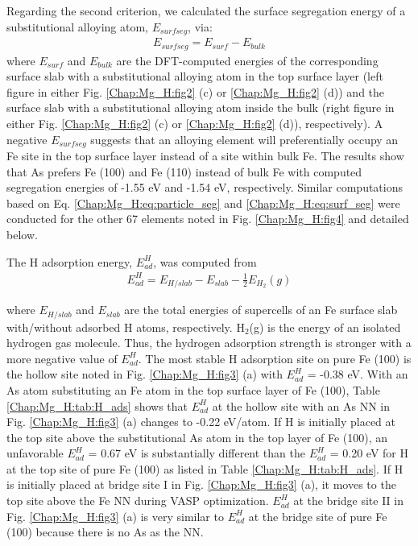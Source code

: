 Regarding the second criterion, we calculated the surface segregation energy of a substitutional alloying atom, $E_{surf seg}$, via:
\begin{align}
 E_{surf seg} = E_{surf} - E_{bulk}
 \label{Chap:Mg_H:eq:surf_seg}
\end{align}
where $E_{surf}$ and $E_{bulk}$ are the \ac{DFT}-computed energies of the corresponding surface slab with a substitutional alloying atom in the top surface layer (left figure in either Fig. \ref{Chap:Mg_H:fig2} (c) or \ref{Chap:Mg_H:fig2} (d)) and the surface slab with a substitutional alloying atom inside the bulk (right figure in either Fig. \ref{Chap:Mg_H:fig2} (c) or \ref{Chap:Mg_H:fig2} (d)), respectively). A negative $E_{surf seg}$ suggests that an alloying element will preferentially occupy an Fe site in the top surface layer instead of a site within bulk Fe. The results show that As prefers Fe (100) and Fe (110) instead of bulk Fe with computed segregation energies of -1.55 eV and -1.54 eV, respectively. Similar computations based on Eq. \ref{Chap:Mg_H:eq:particle_seg} and \ref{Chap:Mg_H:eq:surf_seg} were conducted for the other 67 elements noted in Fig. \ref{Chap:Mg_H:fig4} and detailed below.

The H adsorption energy, $E_{ad}^H$, was computed from
\begin{align}
 E_{ad}^{H} = E_{H/slab} - E_{slab} - \frac{1}{2}E_{H_2}(g)
 \label{Chap:Mg_H:eq:H_ads}
\end{align}

where $E_{H/slab}$ and $E_{slab}$ are the total energies of supercells of an Fe surface slab with/without adsorbed H atoms, respectively. $\text{H}_2$(g) is the energy of an isolated hydrogen gas molecule. Thus, the hydrogen adsorption strength is stronger with a more negative value of $E_{ad}^H$. The most stable H adsorption site on pure Fe (100) is the hollow site noted in Fig. \ref{Chap:Mg_H:fig3} (a) with $E_{ad}^H$ = -0.38 eV. With an As atom substituting an Fe atom in the top surface layer of Fe (100), Table \ref{Chap:Mg_H:tab:H_ads} shows that $E_{ad}^H$ at the hollow site with an As NN in Fig. \ref{Chap:Mg_H:fig3} (a) changes to -0.22 eV/atom. If H is initially placed at the top site above the substitutional As atom in the top layer of Fe (100), an unfavorable $E_{ad}^H$ = 0.67 eV is substantially different than the $E_{ad}^H$ = 0.20 eV for H at the top site of pure Fe (100) as listed in Table \ref{Chap:Mg_H:tab:H_ads}. If H is initially placed at bridge site I in Fig. \ref{Chap:Mg_H:fig3} (a), it moves to the top site above the Fe NN during \ac{VASP} optimization. $E_{ad}^H$ at the bridge site II in Fig. \ref{Chap:Mg_H:fig3} (a) is very similar to $E_{ad}^H$ at the bridge site of pure Fe (100) because there is no As as the NN.

